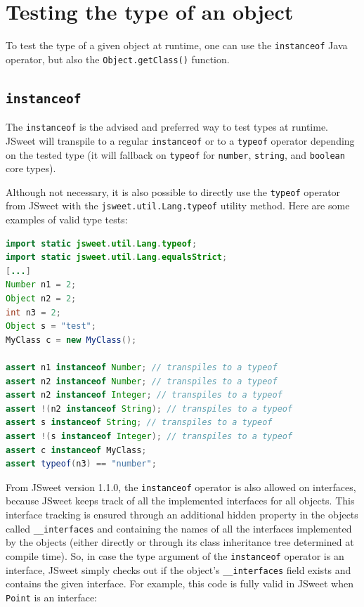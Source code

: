 \documentclass[a4paper]{report}
\begin{document}
\section{Testing the type of an object}

To test the type of a given object at runtime, one can use the \texttt{instanceof} Java operator, but also the \texttt{Object.getClass()} function. 

\subsection{\texttt{instanceof}}

The \texttt{instanceof} is the advised and preferred way to test types at runtime. JSweet will transpile to a regular \texttt{instanceof} or to a \texttt{typeof} operator depending on the tested type (it will fallback on \texttt{typeof} for \texttt{number}, \texttt{string}, and \texttt{boolean} core types).

Although not necessary, it is also possible to directly use the \texttt{typeof} operator from JSweet with the \texttt{jsweet.\-util.\-Lang.\-typeof} utility method. Here are some examples of valid type tests:

\begin{lstlisting}[language=Java]
import static jsweet.util.Lang.typeof;
import static jsweet.util.Lang.equalsStrict;
[...]
Number n1 = 2;
Object n2 = 2;
int n3 = 2;
Object s = "test";
MyClass c = new MyClass();

assert n1 instanceof Number; // transpiles to a typeof
assert n2 instanceof Number; // transpiles to a typeof
assert n2 instanceof Integer; // transpiles to a typeof
assert !(n2 instanceof String); // transpiles to a typeof
assert s instanceof String; // transpiles to a typeof
assert !(s instanceof Integer); // transpiles to a typeof
assert c instanceof MyClass;
assert typeof(n3) == "number";
\end{lstlisting}

From JSweet version 1.1.0, the \texttt{instanceof} operator is also allowed on interfaces, because JSweet keeps track of all the implemented interfaces for all objects. This interface tracking is ensured through an additional hidden property in the objects called \texttt{\_\_interfaces} and containing the names of all the interfaces implemented by the objects (either directly or through its class inheritance tree determined at compile time). So, in case the type argument of the \texttt{instanceof} operator is an interface, JSweet simply checks out if the object's \texttt{\_\_interfaces} field exists and contains the given interface. For example, this code is fully valid in JSweet when \texttt{Point} is an interface:
 
\end{document}
